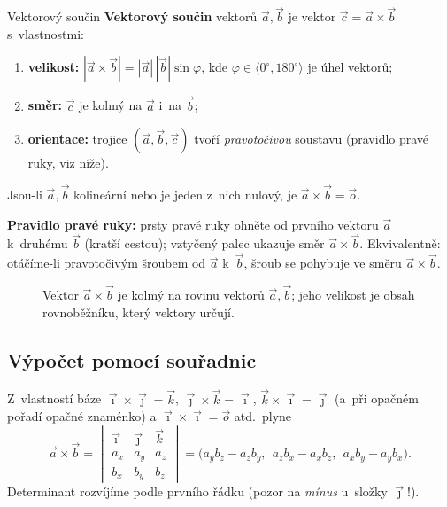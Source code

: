 \documentclass[a4paper,11pt]{article}
\newcommand{\abs}[1]{\left\lvert #1\right\rvert}
\newcommand{\ii}{\vec{\imath}}
\newcommand{\jj}{\vec{\jmath}}
\newcommand{\kk}{\vec{k}}
\begin{document}
\begin{definice}{Vektorový součin}
\textbf{Vektorový součin} vektorů $\vec a,\vec b$ je vektor $\vec c=\vec a\times\vec b$ s~vlastnostmi:
\begin{enumerate}[label=(\arabic*),nosep]
  \item \textbf{velikost:} $\abs{\vec a\times\vec b}=\abs{\vec a}\,\abs{\vec b}\sin\varphi$,
        kde $\varphi\in\langle0^\circ,180^\circ\rangle$ je úhel vektorů;
  \item \textbf{směr:} $\vec c$ je kolmý na $\vec a$ i~na $\vec b$;
  \item \textbf{orientace:} trojice $(\vec a,\vec b,\vec c)$ tvoří \emph{pravotočivou} soustavu
        (pravidlo pravé ruky, viz níže).
\end{enumerate}
Jsou-li $\vec a,\vec b$ kolineární nebo je jeden z~nich nulový, je $\vec a\times\vec b=\vec o$.
\end{definice}

\textbf{Pravidlo pravé ruky:} prsty pravé ruky ohněte od prvního vektoru $\vec a$
k~druhému $\vec b$ (kratší cestou); vztyčený palec ukazuje směr $\vec a\times\vec b$.
Ekvivalentně: otáčíme-li pravotočivým šroubem od $\vec a$ k~$\vec b$, šroub se pohybuje
ve směru $\vec a\times\vec b$.

\begin{figure}[!htbp]
\centering
{}
\caption{Vektor $\vec a\times\vec b$ je kolmý na rovinu vektorů $\vec a,\vec b$;
jeho velikost je obsah rovnoběžníku, který vektory určují.}
\end{figure}

\subsection{Výpočet pomocí souřadnic}

Z~vlastností báze $\ii\times\jj=\kk$, $\jj\times\kk=\ii$, $\kk\times\ii=\jj$
(a~při opačném pořadí opačné znaménko) a $\ii\times\ii=\vec o$ atd.\ plyne
\begin{equation}
  \vec a\times\vec b=
  \begin{vmatrix}
    \ii & \jj & \kk\\
    a_x & a_y & a_z\\
    b_x & b_y & b_z
  \end{vmatrix}
  =\bigl(a_yb_z-a_zb_y,\ \ a_zb_x-a_xb_z,\ \ a_xb_y-a_yb_x\bigr).
\end{equation}
Determinant rozvíjíme podle prvního řádku (pozor na \emph{mínus} u~složky $\jj$!).
\end{document}

